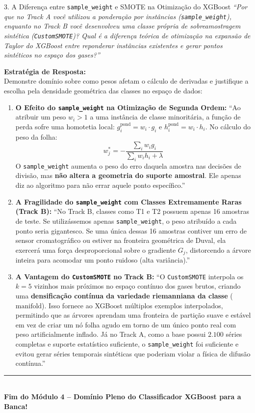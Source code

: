 \documentclass[11pt,a4paper]{article}
\begin{document}
\begin{boardQuestion}{3. A Diferença entre \texttt{sample\_weight} e SMOTE na Otimização do XGBoost}
\textit{“Por que no Track A você utilizou a ponderação por instâncias (\texttt{sample\_weight}), enquanto no Track B você desenvolveu uma classe própria de sobreamostragem sintética (\texttt{CustomSMOTE})? Qual é a diferença teórica de otimização na expansão de Taylor do XGBoost entre reponderar instâncias existentes e gerar pontos sintéticos no espaço dos gases?”}
\end{boardQuestion}

\begin{boardAnswer}
\textbf{Estratégia de Resposta:}\\
Demonstre domínio sobre como pesos afetam o cálculo de derivadas e justifique a escolha pela densidade geométrica das classes no espaço de dados:

\begin{enumerate}[leftmargin=0.8cm]
  \item \textbf{O Efeito do \texttt{sample\_weight} na Otimização de Segunda Ordem:} ``Ao atribuir um peso $w_i > 1$ a uma instância de classe minoritária, a função de perda sofre uma homotetia local: $g_i^{\text{pond}} = w_i \cdot g_i$ e $h_i^{\text{pond}} = w_i \cdot h_i$. No cálculo do peso da folha:
  \begin{equation}
    w_j^* = -\frac{\sum_{i} w_i g_i}{\sum_{i} w_i h_i + \lambda}
  \end{equation}
  O \texttt{sample\_weight} aumenta o peso do erro daquela amostra nas decisões de divisão, mas \textbf{não altera a geometria do suporte amostral}. Ele apenas diz ao algoritmo para não errar aquele ponto específico.''
  \item \textbf{A Fragilidade do \texttt{sample\_weight} com Classes Extremamente Raras (Track B):} ``No Track B, classes como T1 e T2 possuem apenas 16 amostras de teste. Se utilizássemos apenas \texttt{sample\_weight}, o peso atribuído a cada ponto seria gigantesco. Se uma única dessas 16 amostras contiver um erro de sensor cromatográfico ou estiver na fronteira geométrica de Duval, ela exercerá uma força desproporcional sobre o gradiente $G_j$, distorcendo a árvore inteira para acomodar um ponto ruidoso (alta variância).''
  \item \textbf{A Vantagem do \texttt{CustomSMOTE} no Track B:} ``O \texttt{CustomSMOTE} interpola os $k=5$ vizinhos mais próximos no espaço contínuo dos gases brutos, criando uma \textbf{densificação contínua da variedade riemanniana da classe} ($\text{manifold}$). Isso fornece ao XGBoost múltiplos exemplos interpolados, permitindo que as árvores aprendam uma fronteira de partição suave e estável em vez de criar um nó folha agudo em torno de um único ponto real com peso artificialmente inflado. Já no Track A, como a base possui $2.100$ séries completas e suporte estatístico suficiente, o \texttt{sample\_weight} foi suficiente e evitou gerar séries temporais sintéticas que poderiam violar a física de difusão contínua.''
\end{enumerate}
\end{boardAnswer}

\vspace{0.6cm}
\begin{center}
  \rule{0.6\textwidth}{0.8pt}\\[0.2cm]
  \small\textbf{\textsf{Fim do Módulo 4 -- Domínio Pleno do Classificador XGBoost para a Banca!}}
\end{center}
\end{document}
